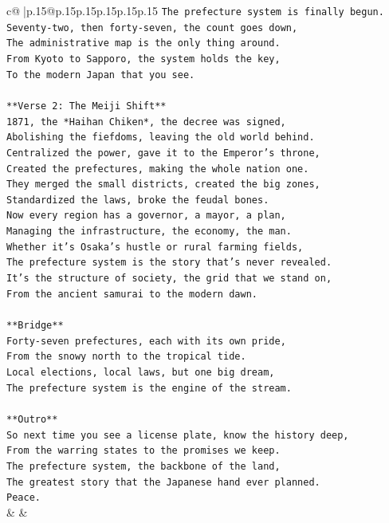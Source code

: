 \documentclass{article}
\begin{document}
{\begin{supertabular}{c@{$\;$}|p{.15\linewidth}@{}p{.15\linewidth}p{.15\linewidth}p{.15\linewidth}p{.15\linewidth}p{.15\linewidth}}
{{{\texttt{The prefecture system is finally begun.} \\
\texttt{Seventy{-}two, then forty{-}seven, the count goes down,} \\
\texttt{The administrative map is the only thing around.} \\
\texttt{From Kyoto to Sapporo, the system holds the key,} \\
\texttt{To the modern Japan that you see.} \\
\\ 
\texttt{**Verse 2: The Meiji Shift**} \\
\texttt{1871, the *Haihan Chiken*, the decree was signed,} \\
\texttt{Abolishing the fiefdoms, leaving the old world behind.} \\
\texttt{Centralized the power, gave it to the Emperor's throne,} \\
\texttt{Created the prefectures, making the whole nation one.} \\
\texttt{They merged the small districts, created the big zones,} \\
\texttt{Standardized the laws, broke the feudal bones.} \\
\texttt{Now every region has a governor, a mayor, a plan,} \\
\texttt{Managing the infrastructure, the economy, the man.} \\
\texttt{Whether it's Osaka's hustle or rural farming fields,} \\
\texttt{The prefecture system is the story that's never revealed.} \\
\texttt{It's the structure of society, the grid that we stand on,} \\
\texttt{From the ancient samurai to the modern dawn.} \\
\\ 
\texttt{**Bridge**} \\
\texttt{Forty{-}seven prefectures, each with its own pride,} \\
\texttt{From the snowy north to the tropical tide.} \\
\texttt{Local elections, local laws, but one big dream,} \\
\texttt{The prefecture system is the engine of the stream.} \\
\\ 
\texttt{**Outro**} \\
\texttt{So next time you see a license plate, know the history deep,} \\
\texttt{From the warring states to the promises we keep.} \\
\texttt{The prefecture system, the backbone of the land,} \\
\texttt{The greatest story that the Japanese hand ever planned.} \\
\texttt{Peace.} \\
            }
        }
    }
    & & \\ \\


\end{supertabular}}
\end{document}

